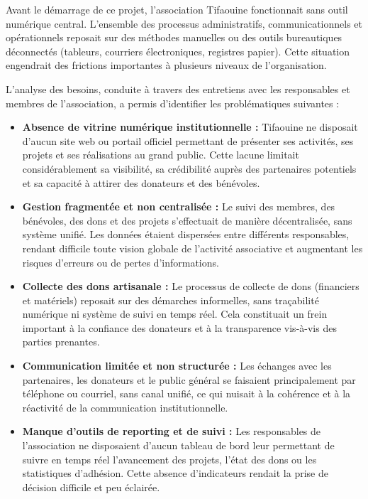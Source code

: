 \documentclass[12pt,a4paper,twoside,openright]{report}
\begin{document}
Avant le démarrage de ce projet, l'association Tifaouine fonctionnait sans outil numérique central. L'ensemble des processus administratifs, communicationnels et opérationnels reposait sur des méthodes manuelles ou des outils bureautiques déconnectés (tableurs, courriers électroniques, registres papier). Cette situation engendrait des frictions importantes à plusieurs niveaux de l'organisation.

L'analyse des besoins, conduite à travers des entretiens avec les responsables et membres de l'association, a permis d'identifier les problématiques suivantes :

\begin{itemize}[label=\textcolor{secondaryGold}{\textbf{$\blacksquare$}}, leftmargin=1.5cm, itemsep=0.35cm]

    \item \textbf{Absence de vitrine numérique institutionnelle :}
    Tifaouine ne disposait d'aucun site web ou portail officiel permettant de présenter ses activités, ses projets et ses réalisations au grand public. Cette lacune limitait considérablement sa visibilité, sa crédibilité auprès des partenaires potentiels et sa capacité à attirer des donateurs et des bénévoles.

    \item \textbf{Gestion fragmentée et non centralisée :}
    Le suivi des membres, des bénévoles, des dons et des projets s'effectuait de manière décentralisée, sans système unifié. Les données étaient dispersées entre différents responsables, rendant difficile toute vision globale de l'activité associative et augmentant les risques d'erreurs ou de pertes d'informations.

    \item \textbf{Collecte des dons artisanale :}
    Le processus de collecte de dons (financiers et matériels) reposait sur des démarches informelles, sans traçabilité numérique ni système de suivi en temps réel. Cela constituait un frein important à la confiance des donateurs et à la transparence vis-à-vis des parties prenantes.

    \item \textbf{Communication limitée et non structurée :}
    Les échanges avec les partenaires, les donateurs et le public général se faisaient principalement par téléphone ou courriel, sans canal unifié, ce qui nuisait à la cohérence et à la réactivité de la communication institutionnelle.

    \item \textbf{Manque d'outils de reporting et de suivi :}
    Les responsables de l'association ne disposaient d'aucun tableau de bord leur permettant de suivre en temps réel l'avancement des projets, l'état des dons ou les statistiques d'adhésion. Cette absence d'indicateurs rendait la prise de décision difficile et peu éclairée.

\end{itemize}
\end{document}
